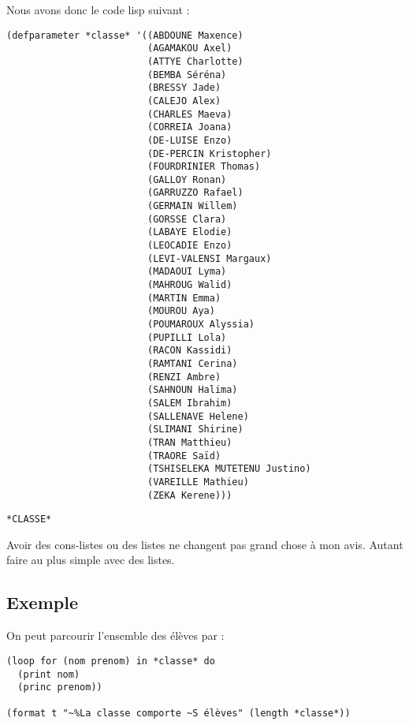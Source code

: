\documentclass[a4paper, 11pt, DIV=18]{scrartcl}
\begin{document}
Nous avons donc le code lisp suivant :
\begin{verbatim}
(defparameter *classe* '((ABDOUNE Maxence)
                         (AGAMAKOU Axel)
                         (ATTYE Charlotte)
                         (BEMBA Séréna)
                         (BRESSY Jade)
                         (CALEJO Alex)
                         (CHARLES Maeva)
                         (CORREIA Joana)
                         (DE-LUISE Enzo)
                         (DE-PERCIN Kristopher)
                         (FOURDRINIER Thomas)
                         (GALLOY Ronan)
                         (GARRUZZO Rafael)
                         (GERMAIN Willem)
                         (GORSSE Clara)
                         (LABAYE Elodie)
                         (LEOCADIE Enzo)
                         (LEVI-VALENSI Margaux)
                         (MADAOUI Lyma)
                         (MAHROUG Walid)
                         (MARTIN Emma)
                         (MOUROU Aya)
                         (POUMAROUX Alyssia)
                         (PUPILLI Lola)
                         (RACON Kassidi)
                         (RAMTANI Cerina)
                         (RENZI Ambre)
                         (SAHNOUN Halima)
                         (SALEM Ibrahim)
                         (SALLENAVE Helene)
                         (SLIMANI Shirine)
                         (TRAN Matthieu)
                         (TRAORE Saïd)
                         (TSHISELEKA MUTETENU Justino)
                         (VAREILLE Mathieu)
                         (ZEKA Kerene)))
\end{verbatim}

\begin{verbatim}
*CLASSE*
\end{verbatim}


Avoir des cons-listes ou des listes ne changent pas grand chose à mon avis.
Autant faire au plus simple avec des listes.

\subsection{Exemple}
\label{sec:org51e2248}

On peut parcourir l'ensemble des élèves par :
\begin{verbatim}
(loop for (nom prenom) in *classe* do
  (print nom)
  (princ prenom))

(format t "~%La classe comporte ~S élèves" (length *classe*))
\end{verbatim}
\end{document}
